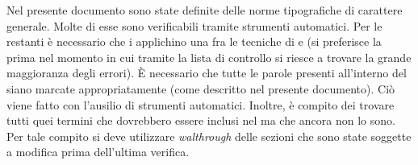 						Nel presente documento sono state definite delle norme tipografiche di carattere generale. Molte di esse sono verificabili tramite strumenti automatici. Per le restanti è necessario che i  applichino una fra le tecniche di  e \textit{}	(si preferisce la prima nel momento in cui tramite la lista di controllo si riesce a trovare la grande maggioranza degli errori).
						È necessario che tutte le parole presenti all'interno del  siano marcate appropriatamente (come descritto nel presente documento). Ciò viene fatto con l'ausilio di strumenti automatici. Inoltre, è compito dei  trovare tutti quei termini che dovrebbero essere inclusi nel  ma che ancora non lo sono. Per tale compito si deve utilizzare \textit{walthrough} delle sezioni che sono state soggette a modifica prima dell'ultima verifica.

